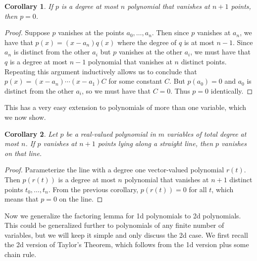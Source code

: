 \documentclass{article}
\theoremstyle{plain}
\newtheorem{corollary}{Corollary}
\theoremstyle{definition}
\theoremstyle{remark}
\begin{document}
\begin{corollary}
	If $p$ is a degree at most $n$ polynomial that vanishes at $n + 1$ points, then $p = 0$.
\end{corollary}
\begin{proof}
	Suppose $p$ vanishes at the points $a_0,\dots,a_n$.
	Then since $p$ vanishes at $a_n$, we have that $p(x) = (x-a_n)q(x)$ where the degree of $q$ is at most $n-1$.
	Since $a_n$ is distinct from the other $a_i$ but $p$ vanishes at the other $a_i$, we must have that $q$ is a degree at most $n-1$ polynomial that vanishes at $n$ distinct points.
	Repeating this argument inductively allows us to conclude that $p(x) = (x-a_n)\cdots(x-a_1)C$ for some constant $C$.
	But $p(a_0) = 0$ and $a_0$ is distinct from the other $a_i$, so we must have that $C = 0$.
	Thus $p = 0$ identically.
\end{proof}

This has a very easy extension to polynomials of more than one variable, which we now show.
\begin{corollary}
	Let $p$ be a real-valued polynomial in $m$ variables of total degree at most $n$.
	If $p$ vanishes at $n+1$ points lying along a straight line, then $p$ vanishes on that line.
\end{corollary}
\begin{proof}
	Parameterize the line with a degree one vector-valued polynomial $r(t)$.
	Then $p(r(t))$ is a degree at most $n$ polynomial that vanishes at $n+1$ distinct points $t_0,\dots,t_n$.
	From the previous corollary, $p(r(t)) = 0$ for all $t$, which means that $p = 0$ on the line.
\end{proof}

Now we generalize the factoring lemma for 1d polynomials to 2d polynomials.
This could be generalized further to polynomials of any finite number of variables, but we will keep it simple and only discuss the 2d case.
We first recall the 2d version of Taylor's Theorem, which follows from the 1d version plus some chain rule.
\end{document}
